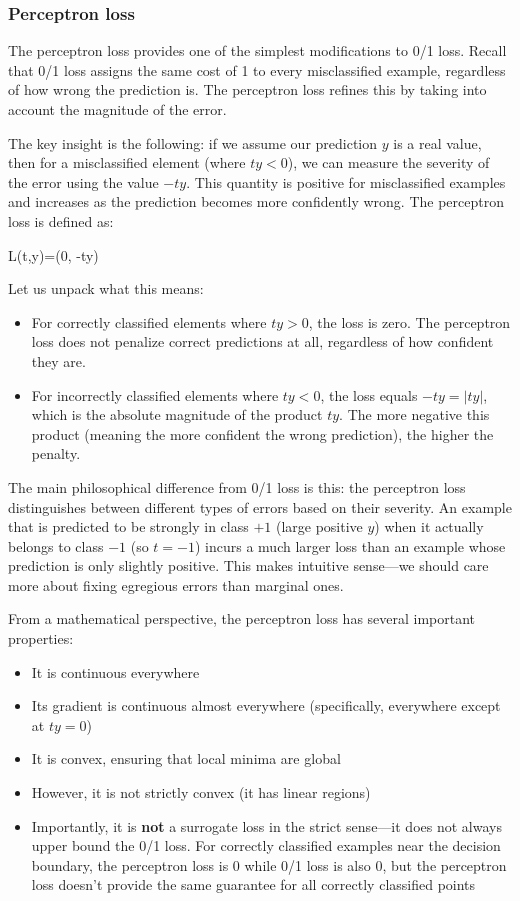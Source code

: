 \subsubsection*{Perceptron loss}

The \alert{perceptron loss} provides one of the simplest modifications to 0/1 loss. Recall that 0/1 loss assigns the same cost of 1 to every misclassified example, regardless of how wrong the prediction is. The perceptron loss refines this by taking into account the magnitude of the error.

The key insight is the following: if we assume our prediction $y$ is a real value, then for a misclassified element (where $ty < 0$), we can measure the severity of the error using the value $-ty$. This quantity is positive for misclassified examples and increases as the prediction becomes more confidently wrong. The perceptron loss is defined as:
\begin{myequation}
L(t,y)=\max{}(0, -ty)
\end{myequation}

Let us unpack what this means:
\begin{itemize} 
\item For correctly classified elements where $ty > 0$, the loss is zero. The perceptron loss does not penalize correct predictions at all, regardless of how confident they are.

\item For incorrectly classified elements where $ty < 0$, the loss equals $-ty = |ty|$, which is the absolute magnitude of the product $ty$. The more negative this product (meaning the more confident the wrong prediction), the higher the penalty.
\end{itemize}

The main philosophical difference from 0/1 loss is this: the perceptron loss distinguishes between different types of errors based on their severity. An example that is predicted to be strongly in class $+1$ (large positive $y$) when it actually belongs to class $-1$ (so $t = -1$) incurs a much larger loss than an example whose prediction is only slightly positive. This makes intuitive sense—we should care more about fixing egregious errors than marginal ones.

From a mathematical perspective, the perceptron loss has several important properties:
\begin{itemize}
\item It is continuous everywhere
\item Its gradient is continuous almost everywhere (specifically, everywhere except at $ty = 0$)
\item It is convex, ensuring that local minima are global
\item However, it is not strictly convex (it has linear regions)
\item Importantly, it is \textbf{not} a surrogate loss in the strict sense—it does not always upper bound the 0/1 loss. For correctly classified examples near the decision boundary, the perceptron loss is 0 while 0/1 loss is also 0, but the perceptron loss doesn't provide the same guarantee for all correctly classified points
\end{itemize}

